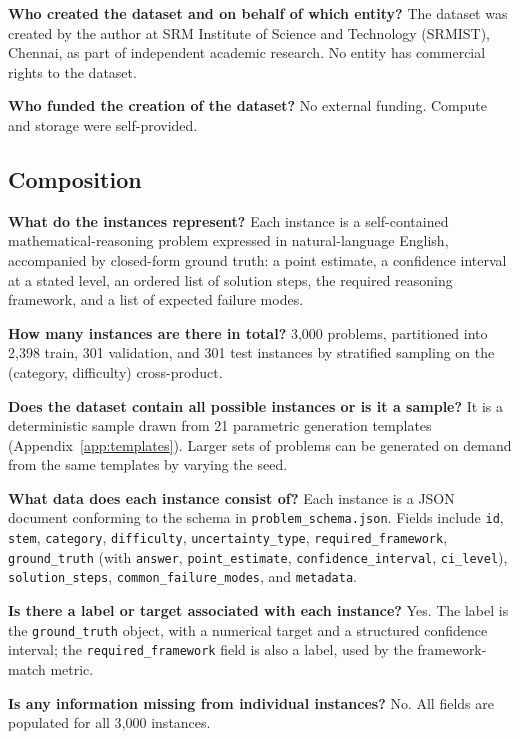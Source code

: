 \documentclass{article}
\begin{document}
\textbf{Who created the dataset and on behalf of which entity?}
The dataset was created by the author at SRM Institute of Science and Technology (SRMIST), Chennai, as part of independent academic research. No entity has commercial rights to the dataset.

\textbf{Who funded the creation of the dataset?}
No external funding. Compute and storage were self-provided.

\subsection*{Composition}

\textbf{What do the instances represent?}
Each instance is a self-contained mathematical-reasoning problem expressed in natural-language English, accompanied by closed-form ground truth: a point estimate, a confidence interval at a stated level, an ordered list of solution steps, the required reasoning framework, and a list of expected failure modes.

\textbf{How many instances are there in total?}
3{,}000 problems, partitioned into 2{,}398 train, 301 validation, and 301 test instances by stratified sampling on the (category, difficulty) cross-product.

\textbf{Does the dataset contain all possible instances or is it a sample?}
It is a deterministic sample drawn from 21 parametric generation templates (Appendix~\ref{app:templates}). Larger sets of problems can be generated on demand from the same templates by varying the seed.

\textbf{What data does each instance consist of?}
Each instance is a JSON document conforming to the schema in \texttt{problem\_schema.json}. Fields include \texttt{id}, \texttt{stem}, \texttt{category}, \texttt{difficulty}, \texttt{uncertainty\_type}, \texttt{required\_framework}, \texttt{ground\_truth} (with \texttt{answer}, \texttt{point\_estimate}, \texttt{confidence\_interval}, \texttt{ci\_level}), \texttt{solution\_steps}, \texttt{common\_failure\_modes}, and \texttt{metadata}.

\textbf{Is there a label or target associated with each instance?}
Yes. The label is the \texttt{ground\_truth} object, with a numerical target and a structured confidence interval; the \texttt{required\_framework} field is also a label, used by the framework-match metric.

\textbf{Is any information missing from individual instances?}
No. All fields are populated for all 3{,}000 instances.
\end{document}
